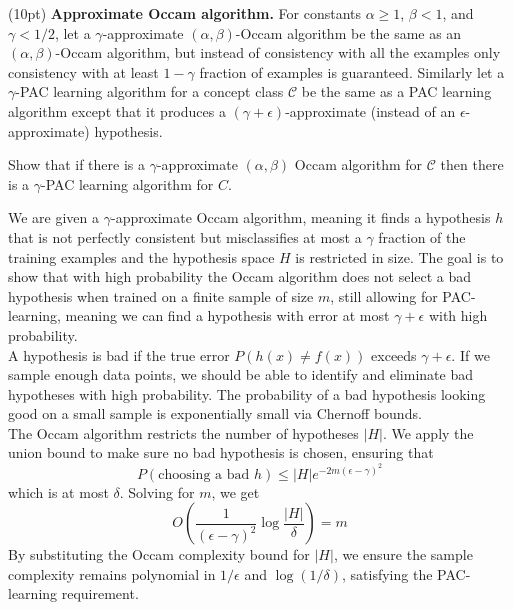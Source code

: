 \documentclass[11pt]{article}
\newcommand*{\C}{{\mathcal C}}
\DeclareMathOperator{\1}{\mathbbm{1}}
\begin{document}
\begin{problem} (10pt) \textbf{Approximate Occam algorithm.}
For constants $\alpha \geq 1$, $\beta <1$, and $\gamma
<1/2$, let a $\gamma$-approximate $(\alpha,\beta)$-Occam algorithm be the same
as an $(\alpha,\beta)$-Occam algorithm, but instead of consistency with all the
examples only consistency with at least $1-\gamma$ fraction of examples is
guaranteed. Similarly let a $\gamma$-PAC learning algorithm for a concept class
$\C$ be the same as a PAC learning algorithm except that it produces a
$(\gamma+\epsilon)$-approximate (instead of an $\epsilon$-approximate)
hypothesis.

Show that if there is a $\gamma$-approximate $(\alpha,\beta)$ Occam
algorithm for $\C$ then there is a $\gamma$-PAC learning algorithm for $C$.
\end{problem}
We are given a $\gamma$-approximate Occam algorithm, meaning it finds a hypothesis $h$ that is not perfectly consistent but misclassifies at most a $\gamma$ fraction of the training examples and the hypothesis space $H$ is restricted in size. The goal is to show that with high probability the Occam algorithm does not select a bad hypothesis when trained on a finite sample of size $m$, still allowing for PAC-learning, meaning we can find a hypothesis with error at most $\gamma + \epsilon$ with high probability. \\
A hypothesis is bad if the true error $P(h(x) \neq f(x))$ exceeds $\gamma + \epsilon$. If we sample enough data points, we should be able to identify and eliminate bad hypotheses with high probability. The probability of a bad hypothesis looking good on a small sample is exponentially small via Chernoff bounds. \\
The Occam algorithm restricts the number of hypotheses $|H|$. We apply the union bound to make sure no bad hypothesis is chosen, ensuring that $$P(\text{choosing a bad } h) \leq |H|e^{-2m(\epsilon - \gamma)^2}$$ which is at most $\delta$. Solving for $m$, we get $$O\left(\frac{1}{(\epsilon-\gamma)^2} \log \frac{|H|}{\delta}\right) = m$$ By substituting the Occam complexity bound for $|H|$, we ensure the sample complexity remains polynomial in $1/\epsilon$ and $\log(1/\delta)$, satisfying the PAC-learning requirement.
\end{document}
